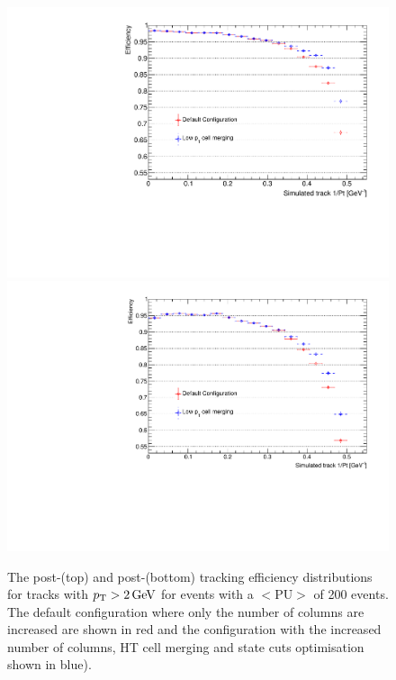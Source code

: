 \begin{figure}[tbp]
\centering
\includegraphics[width=\textwidth]{figs/tk-upgrade/results-lowPtTracking/htTrackingEffVsInvPtFlatGeometry_5000.pdf}
\\
\includegraphics[width=\textwidth]{figs/tk-upgrade/results-lowPtTracking/kfTrackingEffVsInvPtFlatGeometry_5000.pdf}
\caption{The post-\HT (top) and post-\KF (bottom) tracking efficiency distributions for tracks with $p_{\mathrm{T}} > 2\,\text{Ge\hspace{-.08em}V}$ for \ttbar events with a $<\textrm{PU}>$ of 200 events. The default configuration where only the number of \qpt columns are increased are shown in red and the configuration with the increased number of columns, HT cell merging and \KF state cuts optimisation shown in blue).
}
\label{fig:2GeVFlatEff}	
\end{figure}

